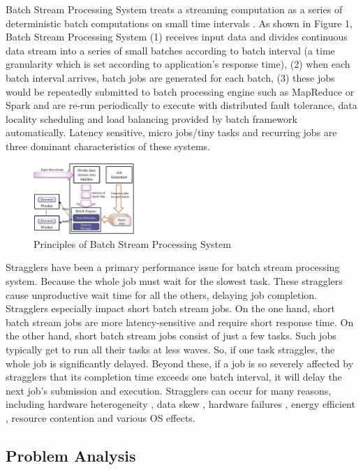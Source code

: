 \documentclass[10pt,conference,compsocconf,letterpaper]{IEEEtran}
\begin{document}
  Batch Stream Processing System treats a streaming computation as a series of deterministic batch computations on small time intervals \cite{Zaharia2013}. As shown in Figure 1, Batch Stream Processing System (1) receives input data and divides continuous data stream into a series of small batches according to batch interval (a time granularity which is set according to application's response time), (2) when each batch interval arrives, batch jobs are generated for each batch, (3) these jobs would be repeatedly submitted to batch processing engine such as MapReduce or Spark and are re-run periodically to execute with distributed fault tolerance, data locality scheduling and load balancing provided by batch framework automatically. Latency sensitive, micro jobs/tiny tasks and recurring jobs are three dominant characteristics of these systems.
  \begin{figure}[htbp]
    \centering
    \includegraphics[width=0.34\textwidth]{FigureBatchStream}
    \caption{Principles of Batch Stream Processing System}\label{Fig. 1:}
  \end{figure}

  Stragglers have been a primary performance issue for batch stream processing system. Because the whole job must wait for the slowest task. These stragglers cause unproductive wait time for all the others, delaying job completion. Stragglers especially impact short batch stream jobs. On the one hand, short batch stream jobs are more latency-sensitive and require short response time. On the other hand, short batch stream jobs consist of just a few tasks. Such jobs typically get to run all their tasks at less waves. So, if one task straggles, the whole job is significantly delayed. Beyond these, if a job is so severely affected by stragglers that its completion time exceeds one batch interval, it will delay the next job's submission and execution. Stragglers can occur for many reasons, including hardware heterogeneity \cite{Reiss2012}, data skew \cite{Kwon2012}, hardware failures \cite{Ananthanarayanan2010}, energy efficient \cite{Cheng2015}, resource contention and various OS effects.

\subsection{Problem Analysis}
\end{document}
